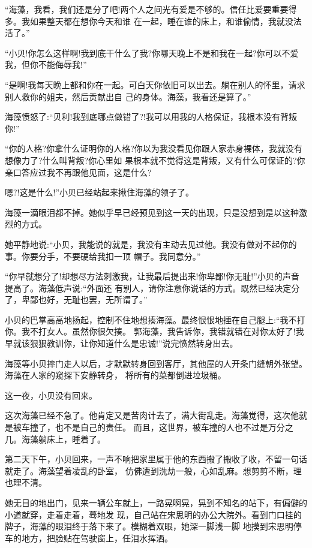 \documentclass[11pt,a4paper,onecolumn]{article}
\begin{document}
``海藻，我看，我们还是分了吧!两个人之间光有爱是不够的。信任比爱要重要得多。我如果整天都在想你今天和谁
在一起，睡在谁的床上，和谁偷情，我就没法活了。''

``小贝!你怎么这样啊!我到底干什么了我?你哪天晚上不是和我在一起?你可以不爱我，但你不能侮辱我!''

``是啊!我每天晚上都和你在一起。可白天你依旧可以出去。躺在别人的怀里，请求别人救你的姐夫，然后贡献出自
己的身体。海藻，我看还是算了。''

海藻愤怒了:``贝利!我到底哪点做错了?!我可以用我的人格保证，我根本没有背叛你!''

``你的人格?你拿什么证明你的人格?你以为我没看见你跟人家赤身裸体，我就没有想像力了?什么叫背叛?你心里如
果根本就不觉得这是背叛，又有什么可保证的?你亲口答应过我不再跟他见面，这是什么?

嗯?!这是什么!''小贝已经站起来揪住海藻的领子了。

海藻一滴眼泪都不掉。她似乎早已经预见到这一天的出现，只是没想到是以这种激烈的方式。

她平静地说:``小贝，我能说的就是，我没有主动去见过他。我没有做对不起你的事。你要分手，不要硬给我扣一顶
帽子。我同意分。''

``你早就想分了!却想尽方法刺激我，让我最后提出来!你卑鄙!你无耻!''小贝的声音提高了。海藻低声说:``外面还
有别人，请你注意你说话的方式。既然已经决定分了，卑鄙也好，无耻也罢，无所谓了。''

小贝的巴掌高高地扬起，控制不住地想揍海藻。最终恨恨地捶在自己腿上:``我不打你。我不打女人。虽然你很欠揍。
郭海藻，我告诉你，我错就错在对你太好了!我早就该狠狠教训你，让你知道什么是忠诚!''说完愤然转身出去。

海藻等小贝摔门走人以后，才默默转身回到客厅，其他屋的人开条门缝朝外张望。海藻在人家的窥探下安静转身，
将所有的菜都倒进垃圾桶。

这一夜，小贝没有回来。

这次海藻已经不急了。他肯定又是苦肉计去了，满大街乱走。海藻觉得，这次他就是被车撞了，也不是自己的责任。
而且，这世界，被车撞的人也不过是万分之几。海藻躺床上，睡着了。

第二天下午，小贝回来，一声不响把家里属于他的东西搬了搬收了收，不留一句话就走了。海藻望着凌乱的卧室，
仿佛遭到洗劫一般，心如乱麻。想剪剪不断，理也理不清。

她无目的地出门，见来一辆公车就上，一路晃啊晃，晃到不知名的站下，有偏僻的小道就穿，走着走着，蓦地发
现，自己站在宋思明的办公大院外。看到门口挂的牌子，海藻的眼泪终于落下来了。模糊着双眼，她深一脚浅一脚
地摸到宋思明停车的地方，把脸贴在驾驶窗上，任泪水挥洒。
\end{document}
